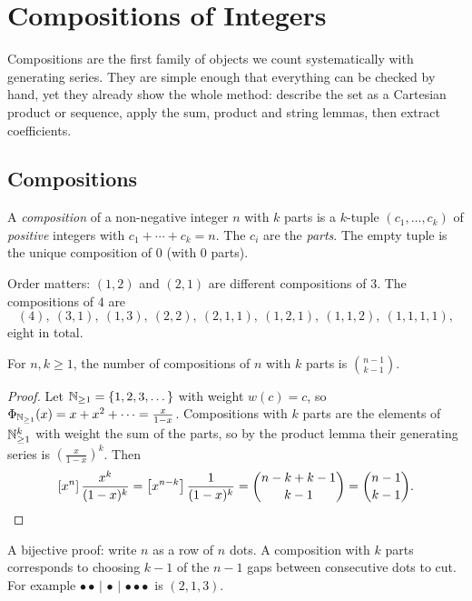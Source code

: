 \chapter{Compositions of Integers}

Compositions are the first family of objects we count systematically with generating series.
They are simple enough that everything can be checked by hand, yet they already show the
whole method: describe the set as a Cartesian product or sequence, apply the sum, product and
string lemmas, then extract coefficients.

\section{Compositions}

\begin{definition}[Composition]
A \emph{composition} of a non-negative integer $n$ with $k$ parts is a $k$-tuple
$(c_1, \dots, c_k)$ of \emph{positive} integers with $c_1 + \cdots + c_k = n$. The $c_i$ are
the \emph{parts}. The empty tuple is the unique composition of $0$ (with $0$ parts).
\end{definition}

Order matters: $(1,2)$ and $(2,1)$ are different compositions of $3$. The compositions of $4$ are
\[
(4),\ (3,1),\ (1,3),\ (2,2),\ (2,1,1),\ (1,2,1),\ (1,1,2),\ (1,1,1,1),
\]
eight in total.

\begin{theorem}
For $n, k \ge 1$, the number of compositions of $n$ with $k$ parts is $\binom{n-1}{k-1}$.
\end{theorem}
\begin{proof}
Let $\mathbb{N}_{\ge1} = \{1, 2, 3, \dots\}$ with weight $w(c) = c$, so
$\Phi_{\mathbb{N}_{\ge1}}(x) = x + x^2 + \cdots = \frac{x}{1-x}$. Compositions with $k$ parts are the
elements of $\mathbb{N}_{\ge1}^k$ with weight the sum of the parts, so by the product lemma their
generating series is $\left(\frac{x}{1-x}\right)^k$. Then
\[
\left[x^{n}\right]\frac{x^k}{(1-x)^k} = \left[x^{n-k}\right]\frac{1}{(1-x)^k} = \binom{n-k+k-1}{k-1} = \binom{n-1}{k-1}.
\]
\end{proof}

\begin{aside}
A bijective proof: write $n$ as a row of $n$ dots. A composition with $k$ parts corresponds to
choosing $k-1$ of the $n-1$ gaps between consecutive dots to cut. For example
$\bullet\bullet\,|\,\bullet\,|\,\bullet\bullet\bullet$ is $(2,1,3)$.
\end{aside}

